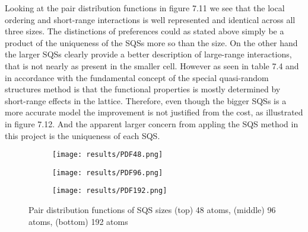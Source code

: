 Looking at the pair distribution functions in figure 7.11 we see that the local ordering and short-range interactions is well represented and identical across all three sizes. The distinctions of preferences could as stated above simply be a product of the uniqueness of the SQSs more so than the size. On the other hand the larger SQSs clearly provide a better description of large-range interactions, that is not nearly as present in the smaller cell. However as seen in table 7.4 and in accordance with the fundamental concept of the special quasi-random structures method is that the functional properties is mostly determined by short-range effects in the lattice. Therefore, even though the bigger SQSs is a more accurate model the improvement is not justified from the cost, as illustrated in figure 7.12. And the apparent larger concern from appling the SQS method in this project is the uniqueness of each SQS.

\begin{figure}[H]
\begin{subfigure}{\textwidth}
\texttt{[image: results/PDF48.png]}
\end{subfigure}
\begin{subfigure}{\textwidth}
\texttt{[image: results/PDF96.png]}
\end{subfigure}
\begin{subfigure}{\textwidth}
\texttt{[image: results/PDF192.png]}
\end{subfigure}
\caption{Pair distribution functions of SQS sizes (top) 48 atoms, (middle) 96 atoms, (bottom) 192 atoms}
\end{figure}
